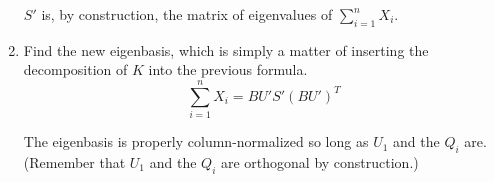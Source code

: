 \documentclass[english]{article}
\begin{document}
\begin{enumerate}
$S'$ is, by construction, the matrix of eigenvalues of $\sum_{i=1}^n X_i$.

\item Find the new eigenbasis, which is simply a matter of inserting the decomposition of $K$ into the previous formula.
\begin{equation}\label{result multiple} \sum_{i=1}^n X_i = B U' S' (B U')^T\end{equation}

The eigenbasis is properly column-normalized so long as $U_1$ and the $Q_i$ are. (Remember that $U_1$ and the $Q_i$ are orthogonal by construction.)
\end{enumerate}
\end{document}
